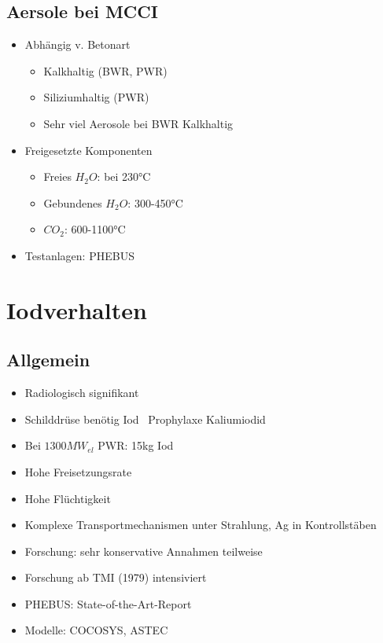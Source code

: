 \documentclass[12pt]{article}
\begin{document}
\subsection{Aersole bei MCCI}
\begin{itemize}[noitemsep]
	\item Abhängig v. Betonart
		\begin{itemize}[noitemsep]
			\item Kalkhaltig (BWR, PWR)
			\item Siliziumhaltig (PWR)
			\item Sehr viel Aerosole bei BWR Kalkhaltig
		\end{itemize}
	\item Freigesetzte Komponenten
		\begin{itemize}[noitemsep]
			\item Freies \(H_2O\): bei 230°C
			\item Gebundenes \(H_2O\): 300-450°C
			\item \(CO_2\): 600-1100°C
		\end{itemize}
	\item Testanlagen: PHEBUS
\end{itemize}

\section{Iodverhalten}

\subsection{Allgemein}
\begin{itemize}[noitemsep]
	\item Radiologisch signifikant
	\item Schilddrüse benötig Iod \textrightarrow\ Prophylaxe Kaliumiodid
	\item Bei \(1300 MW_{el}\) PWR: 15kg Iod
	\item Hohe Freisetzungsrate
	\item Hohe Flüchtigkeit
	\item Komplexe Transportmechanismen unter Strahlung, Ag in Kontrollstäben
	\item Forschung: sehr konservative Annahmen teilweise
	\item Forschung ab TMI (1979) intensiviert
	\item PHEBUS: State-of-the-Art-Report
	\item Modelle: COCOSYS, ASTEC
\end{itemize}
\end{document}
